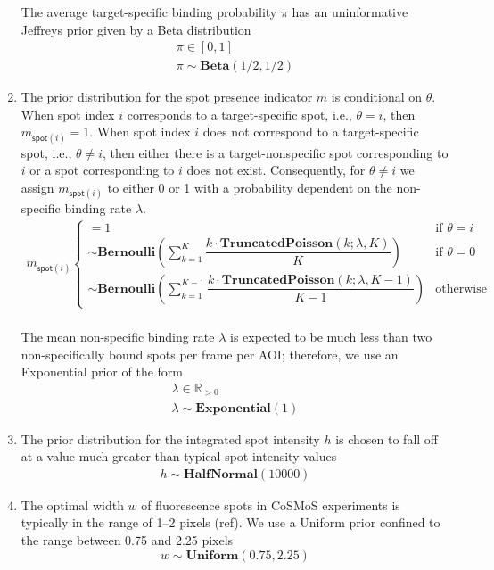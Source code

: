 \begin{enumerate}
\noindent
The average target-specific binding probability $\pi$ has an uninformative Jeffreys prior given by a Beta distribution
%
\begin{gather*}
    \pi \in [0, 1] \\
    \pi \sim \mathbf{Beta}(1/2, 1/2)
\end{gather*}

\item The prior distribution for the spot presence indicator $m$ is conditional on $\theta$. When spot index $i$ corresponds to a target-specific spot, i.e., $\theta = i$, then $m_{\mathsf{spot}(i)} = 1$. When spot index $i$ does not correspond to a target-specific spot, i.e., $\theta \neq i$, then either there is a target-nonspecific spot corresponding to $i$ or a spot corresponding to $i$ does not exist. Consequently, for $\theta \neq i$ we assign $m_{\mathsf{spot}(i)}$ to either 0 or 1 with a probability dependent on the non-specific binding rate $\lambda$.
%
\begin{gather*}
    m_{\mathsf{spot}(i)}
    \begin{cases}
         = 1 & \text{if $\theta = i$} \\
        \sim \mathbf{Bernoulli} \left( \sum_{k=1}^K \dfrac{k \cdot \mathbf{TruncatedPoisson}(k; \lambda, K)}{K} \right) & \text{if $\theta = 0$} \\
        \sim \mathbf{Bernoulli} \left( \sum_{k=1}^{K-1} \dfrac{k \cdot \mathbf{TruncatedPoisson}(k; \lambda, K-1)}{K-1} \right) & \text{otherwise}
    \end{cases} \\
\end{gather*}

\noindent
The mean non-specific binding rate $\lambda$ is expected to be much less than two non-specifically bound spots per frame per AOI; therefore, we use an Exponential prior of the form
%
\begin{gather*}
    \lambda \in \mathbb{R}_{>0} \\
    \lambda \sim \mathbf{Exponential}(1)
\end{gather*}

\item The prior distribution for the integrated spot intensity $h$ is chosen to fall off at a value much greater than typical spot intensity values 
%
\begin{gather*}
    h \sim \mathbf{HalfNormal}(10000)
\end{gather*}

\item The optimal width $w$ of fluorescence spots in CoSMoS experiments is typically in the range of 1--2 pixels (ref). We use a Uniform prior confined to the range between 0.75 and 2.25 pixels
%
\begin{equation}
    w \sim \textbf{Uniform}(0.75, 2.25)
\end{equation}


\end{enumerate}
